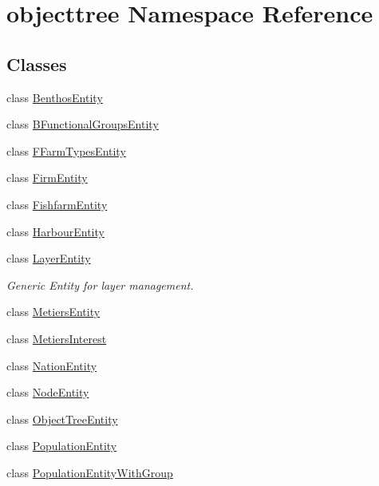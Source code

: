 \hypertarget{namespaceobjecttree}{}\section{objecttree Namespace Reference}
\label{namespaceobjecttree}
\subsection*{Classes}
\begin{DoxyCompactItemize}
\item 
class \mbox{\hyperlink{classobjecttree_1_1_benthos_entity}{Benthos\+Entity}}
\item 
class \mbox{\hyperlink{classobjecttree_1_1_b_functional_groups_entity}{B\+Functional\+Groups\+Entity}}
\item 
class \mbox{\hyperlink{classobjecttree_1_1_f_farm_types_entity}{F\+Farm\+Types\+Entity}}
\item 
class \mbox{\hyperlink{classobjecttree_1_1_firm_entity}{Firm\+Entity}}
\item 
class \mbox{\hyperlink{classobjecttree_1_1_fishfarm_entity}{Fishfarm\+Entity}}
\item 
class \mbox{\hyperlink{classobjecttree_1_1_harbour_entity}{Harbour\+Entity}}
\item 
class \mbox{\hyperlink{classobjecttree_1_1_layer_entity}{Layer\+Entity}}
\begin{DoxyCompactList}\small\item\em Generic Entity for layer management. \end{DoxyCompactList}\item 
class \mbox{\hyperlink{classobjecttree_1_1_metiers_entity}{Metiers\+Entity}}
\item 
class \mbox{\hyperlink{classobjecttree_1_1_metiers_interest}{Metiers\+Interest}}
\item 
class \mbox{\hyperlink{classobjecttree_1_1_nation_entity}{Nation\+Entity}}
\item 
class \mbox{\hyperlink{classobjecttree_1_1_node_entity}{Node\+Entity}}
\item 
class \mbox{\hyperlink{classobjecttree_1_1_object_tree_entity}{Object\+Tree\+Entity}}
\item 
class \mbox{\hyperlink{classobjecttree_1_1_population_entity}{Population\+Entity}}
\item 
class \mbox{\hyperlink{classobjecttree_1_1_population_entity_with_group}{Population\+Entity\+With\+Group}}
\item 

\end{DoxyCompactItemize}
